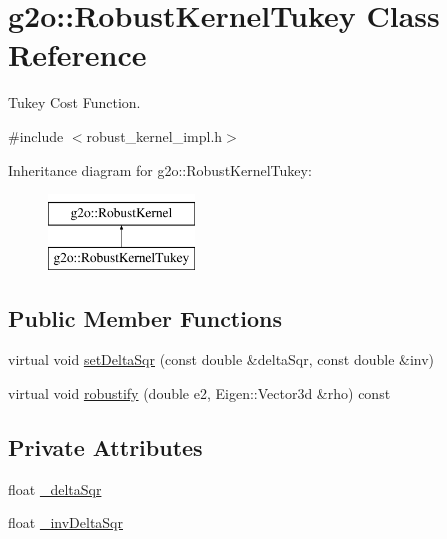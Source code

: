 \hypertarget{classg2o_1_1_robust_kernel_tukey}{}\section{g2o\+:\+:Robust\+Kernel\+Tukey Class Reference}
\label{classg2o_1_1_robust_kernel_tukey}


Tukey Cost Function.  




{\ttfamily \#include $<$robust\+\_\+kernel\+\_\+impl.\+h$>$}

Inheritance diagram for g2o\+:\+:Robust\+Kernel\+Tukey\+:\begin{figure}[H]
\begin{center}
\leavevmode
\includegraphics[height=2.000000cm]{classg2o_1_1_robust_kernel_tukey}
\end{center}
\end{figure}
\subsection*{Public Member Functions}
\begin{DoxyCompactItemize}
\item 
virtual void \mbox{\hyperlink{classg2o_1_1_robust_kernel_tukey_a0602ba130364506d65fb86f3473209aa}{set\+Delta\+Sqr}} (const double \&delta\+Sqr, const double \&inv)
\item 
virtual void \mbox{\hyperlink{classg2o_1_1_robust_kernel_tukey_a415fbc0b4033a8330700e66c60305b13}{robustify}} (double e2, Eigen\+::\+Vector3d \&rho) const
\end{DoxyCompactItemize}
\subsection*{Private Attributes}
\begin{DoxyCompactItemize}
\item 
float \mbox{\hyperlink{classg2o_1_1_robust_kernel_tukey_a3964d90966fa04e5d8002c1c52bda718}{\+\_\+delta\+Sqr}}
\item 
float \mbox{\hyperlink{classg2o_1_1_robust_kernel_tukey_addca0bfe5d4cafbe0a030c645efd2754}{\+\_\+inv\+Delta\+Sqr}}
\end{DoxyCompactItemize}

